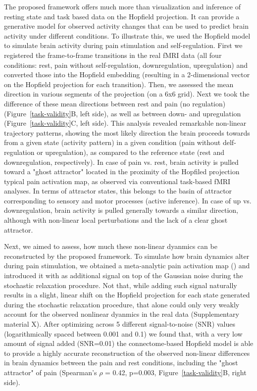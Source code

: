 \documentclass{article}
\begin{document}
The proposed framework offers much more than visualization and inference of resting state and task based data on the Hopfield projection.
It can provide a generative model for observed activity changes that can be used to predict brain activity under different conditions. To illustrate this, we used the Hopfield model to simulate brain activity during pain stimulation and self-regulation.
First we registered the frame-to-frame transitions in the real fMRI data (all four conditions: rest, pain without self-regulation, downregulation, upregulation) and converted those into the Hopfield embedding (resulting in a 2-dimensional vector on the Hopfield projection for each transition). Then, we assessed the mean direction in various segments of the projection (on a 6x6 grid). Next we took the difference of these mean directions between rest and pain (no regulation) (Figure~\ref{task-validity}B, left side), as well as between down- and upregulation (Figure~\ref{task-validity}C, left side). This analysis revealed remarkable non-linear trajectory patterns, showing the most likely direction the brain proceeds towards from a given state (activity pattern) in a given condition (pain without delf-regulation or upregulation), as compared to the reference state (rest and downregulation, respectively). In case of pain vs. rest, brain activity is pulled toward a "ghost attractor" located in the proximity of the Hopfiled projection typical pain activation map, as observed via conventional task-based fMRI analyses. In terms of attractor states, this belongs to the basin of attractor corresponding to sensory and motor processes (active inference). In case of up vs. downregulation, brain activity is pulled generally towards a similar direction, although with non-linear local perturbations and the lack of a clear ghost attractor.

Next, we aimed to assess, how much these non-linear dyanmics can be reconstructed by the proposed framework. To simulate how brain dynamics alter during pain stimulation, we obtained a meta-analytic pain activation map (\href{https://doi.org/10.1038/s41467-021-21179-3}{}) and introduced it with as additional signal on top of the Gaussian noise during the stochastic relaxation procedure. Not that, while adding such signal naturally results in a slight, linear shift on the Hopfield projection for each state generated during the stochastic relaxation procedure, that alone could only very weakly account for the observed nonlinear dyanmics in the real data (Supplementary material X). After optimizing across 5 different signal-to-noise (SNR) values (logarithmically spaced between 0.001 and 0.1) we found that, with a very low amount of signal added (SNR=0.01) the connectome-based Hopfield model is able to provide a highly accurate reconstruction of the observed non-linear differences in brain dynamics between the pain and rest conditions, including the "ghost attractor" of pain (Spearman's $\rho$ = 0.42, p=0.003, Figure~\ref{task-validity}B, right side).
\end{document}
